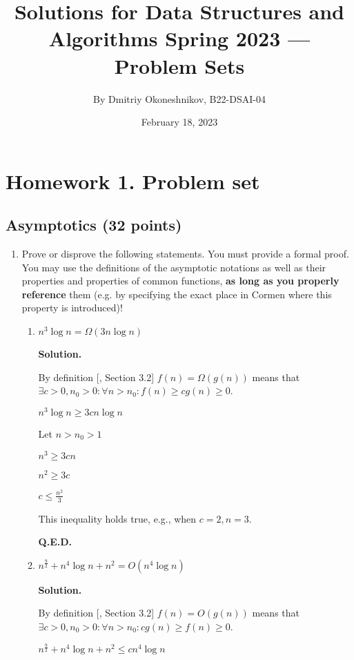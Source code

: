 \documentclass{article}
\title{Solutions for Data Structures and Algorithms Spring 2023 — Problem Sets}
\author{By Dmitriy Okoneshnikov, B22-DSAI-04}
\date{February 18, 2023}
\begin{document}
\maketitle

\section*{Homework 1. Problem set}

\subsection*{Asymptotics (32 points)}
\begin{enumerate}
    \item Prove or disprove the following statements. You must provide a formal proof. You may use the definitions of the asymptotic notations as well as their properties and properties of common functions, \textbf{as long as you properly reference} them (e.g. by specifying the exact place in Cormen where this property is introduced)!

    \begin{enumerate}
        \item $n^3\log{n} = \Omega(3n\log{n})$
        
        \textbf{Solution.}

        By definition [, Section 3.2] $f(n) = \Omega(g(n))$ means that $\exists c > 0, n_0 > 0: \forall n > n_0: f(n) \geq cg(n) \geq 0$.
        
        $n^3\log{n} \geq 3cn\log{n}$

        Let $n > n_0 > 1$

        $n^3 \geq 3cn$

        $n^2 \geq 3c$

        $c \leq \frac{n^2}{3}$

        This inequality holds true, e.g., when $c = 2, n = 3$.

        \textbf{Q.E.D.}
        
        \item $n^\frac{9}{2} + n^4\log{n} + n^2 = O(n^4\log{n})$

        \textbf{Solution.}

        By definition [, Section 3.2] $f(n) = O(g(n))$ means that $\exists c > 0, n_0 > 0: \forall n > n_0: cg(n) \geq f(n) \geq 0$.

        $n^\frac{9}{2} + n^4\log{n} + n^2 \leq cn^4\log{n}$


\end{enumerate}
\end{enumerate}
\end{document}
